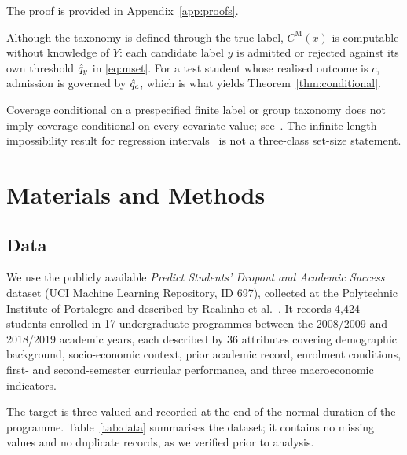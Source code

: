 \noindent The proof is provided in Appendix~\ref{app:proofs}.

\begin{remark}
Although the taxonomy is defined through the true label, $C^{\mathrm{M}}(x)$ is
computable without knowledge of $Y$: each candidate label $y$ is admitted or
rejected against its own threshold $\hat{q}_y$ in \eqref{eq:mset}. For a test
student whose realised outcome is $c$, admission is governed by $\hat{q}_c$, which
is what yields Theorem~\ref{thm:conditional}.
\end{remark}

\begin{remark}\label{rem:impossible}
Coverage conditional on a prespecified finite label or group taxonomy
does not imply coverage conditional on every covariate value;
see~\cite{vovk2012,barber2021}. The infinite-length impossibility
result for regression intervals~\cite{leiwasserman2014} is not a
three-class set-size statement.
\end{remark}

\section{Materials and Methods}\label{sec:methods}

\subsection{Data}

We use the publicly available \emph{Predict Students' Dropout and Academic
Success} dataset (UCI Machine Learning Repository, ID 697), collected at the
Polytechnic Institute of Portalegre and described by Realinho et
al.~\cite{realinho2022}. It records 4{,}424 students enrolled in 17
undergraduate programmes between the 2008/2009 and 2018/2019 academic years,
each described by 36 attributes covering demographic background, socio-economic
context, prior academic record, enrolment conditions, first- and
second-semester curricular performance, and three macroeconomic indicators.

The target is three-valued and recorded at the end of the normal duration of the
programme. Table~\ref{tab:data} summarises the dataset; it contains no missing
values and no duplicate records, as we verified prior to analysis.

